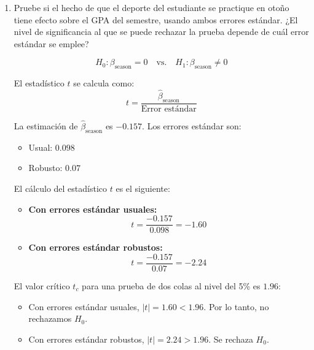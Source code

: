 \documentclass[10pt,a4paper]{article}
\begin{document}
\begin{enumerate}



\item  Pruebe si el hecho de que el deporte del estudiante se practique en otoño tiene efecto sobre
el GPA del semestre, usando ambos errores estándar. ¿El nivel de significancia al que se
puede rechazar la prueba depende de cuál error estándar se emplee?

{\color{blue}
\[
H_0: \beta_{\text{season}} = 0 \quad \text{vs.} \quad H_1: \beta_{\text{season}} \neq 0
\]


El estadístico \(t\) se calcula como:
\[
t = \frac{\widehat{\beta}_{\text{season}}}{\text{Error estándar}}
\]


La estimación de \(\hat{\beta}_{\text{season}}\) es \(-0.157\). Los errores estándar son:
\begin{itemize}
    \item Usual: \(0.098\)
    \item Robusto: \(0.07\)
\end{itemize}

\noindent El cálculo del estadístico \(t\) es el siguiente:

\begin{itemize}
    \item \textbf{Con errores estándar usuales:}
    \[
    t = \frac{-0.157}{0.098} = -1.60
    \]
    \item \textbf{Con errores estándar robustos:}
    \[
    t = \frac{-0.157}{0.07} = -2.24
    \]
\end{itemize}


El valor crítico \(t_c\) para una prueba de dos colas al nivel del 5\% es \(1.96\):
\begin{itemize}
    \item Con errores estándar usuales, \(|t| = 1.60 < 1.96\). Por lo tanto, no rechazamos \(H_0\).
    \item Con errores estándar robustos, \(|t|=2.24 >1.96\). Se rechaza  \(H_0\).


\end{itemize}}
\end{enumerate}
\end{document}
